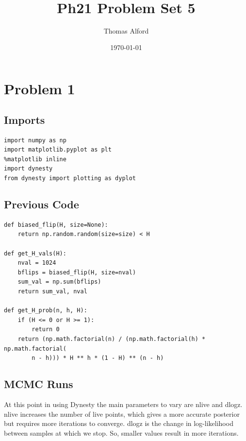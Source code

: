 \documentclass[11pt]{article}
\author{Thomas Alford}
\date{\today}
\title{Ph21 Problem Set 5}
\begin{document}
\maketitle
\section*{Problem 1}
\label{sec-1}
\subsection*{Imports}
\label{sec-1-1}
\begin{verbatim}
import numpy as np
import matplotlib.pyplot as plt
%matplotlib inline
import dynesty
from dynesty import plotting as dyplot
\end{verbatim}

\subsection*{Previous Code}
\label{sec-1-2}

\begin{verbatim}
def biased_flip(H, size=None):
    return np.random.random(size=size) < H

def get_H_vals(H):
    nval = 1024
    bflips = biased_flip(H, size=nval)
    sum_val = np.sum(bflips)
    return sum_val, nval

def get_H_prob(n, h, H):
    if (H <= 0 or H >= 1):
        return 0
    return (np.math.factorial(n) / (np.math.factorial(h) * np.math.factorial(
        n - h))) * H ** h * (1 - H) ** (n - h)
\end{verbatim}

\subsection*{MCMC Runs}
\label{sec-1-3}

At this point in using Dynesty the main parameters to vary are nlive and
dlogz. nlive increases the number of live points, which gives a more accurate
posterior but requires more iterations to converge. dlogz is the change in
log-likelihood between samples at which we stop. So, smaller values result in
more iterations.
\end{document}
